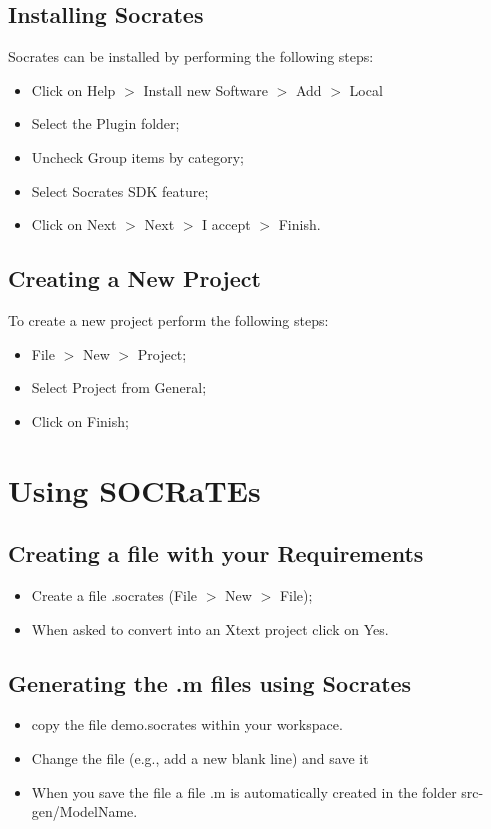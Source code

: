 \documentclass[12pt]{extarticle}
\newcommand{\<}{\langle}
\renewcommand{\>}{\rangle}
\theoremstyle{definition}
\begin{document}
\subsection{Installing Socrates}
Socrates can be installed by performing the following steps:
\begin{itemize}
\item Click on Help $>$ Install new Software $>$ Add $>$ Local
\item Select the Plugin folder;
\item Uncheck Group items by category;
\item Select Socrates SDK feature;
\item Click on Next $>$ Next $>$ I accept $>$ Finish.
\end{itemize}

\subsection{Creating a New Project}
To create a new project perform the following steps:
\begin{itemize}
\item File $>$ New $>$ Project;
\item Select Project from General;
\item Click on Finish;
\end{itemize}


\section{Using SOCRaTEs}

\subsection{Creating a file with your Requirements}
\begin{itemize}
\item Create a file .socrates (File $>$ New $>$ File);
\item When asked to convert into an Xtext project click on Yes.
\end{itemize}

\subsection{Generating the .m files using Socrates}
\begin{itemize}
\item copy the file demo.socrates within your workspace.
\item Change the file (e.g., add a new blank line) and save it
\item	When you save the file a file .m is automatically created in the folder src-gen/ModelName.
\end{itemize}
\end{document}
